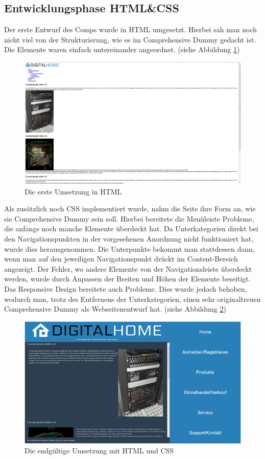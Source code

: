 	\subsection{Entwicklungsphase HTML\&CSS}
Der erste Entwurf des Comps wurde in HTML umgesetzt. Hierbei sah man noch nicht viel von der Strukturierung, wie es im Comprehensive Dummy gedacht ist. Die Elemente waren einfach untereinander angeordnet. (siehe Abbildung  \ref{mini_comp2})
\\
\begin{figure} [hp]
\includegraphics[width=\textwidth]{./img/mini_comp2.png}
\caption{Die erste Umsetzung in HTML}
\label{mini_comp2}
\end{figure}
Als zusätzlich noch CSS implementiert wurde, nahm die Seite ihre Form an, wie sie Comprehensive Dummy sein soll. Hierbei bereitete die Menüleiste Probleme, die anfangs noch manche Elemente überdeckt hat. Da Unterkategorien direkt bei den Navigationspunkten in der vorgesehenen Anordnung nicht funktioniert hat, wurde dies herausgenommen. Die Unterpunkte bekommt man stattdessen dann, wenn man auf den jeweiligen Navigationspunkt drückt im Content-Bereich angezeigt. Der Fehler, wo andere Elemente von der Navigationsleiste überdeckt werden, wurde durch Anpassen der Breiten und Höhen der Elemente beseitigt.
\\
Das Responsive Design bereitete auch Probleme. Dies wurde jedoch behoben, wodurch man, trotz des Entfernens der Unterkategorien, einen sehr originaltreuen Comprehensive Dummy als Webseitenentwurf hat. (siehe Abbildung  \ref{mini_comp3})
\begin{figure} [hp]
\includegraphics[width=\textwidth]{./img/mini_comp3.png}
\caption{Die endgültige Umsetzung mit HTML und CSS}
\label{mini_comp3}
\end{figure}

